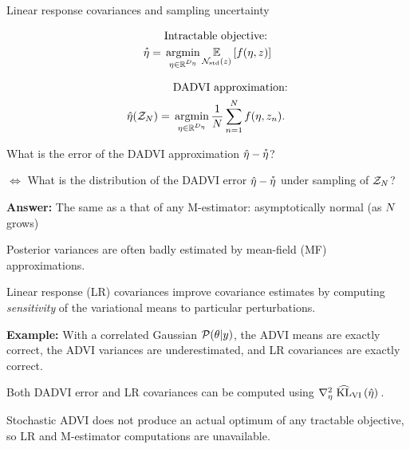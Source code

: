 \documentclass[8pt]{beamer}\usepackage[]{graphicx}\usepackage[]{color}
\begin{document}
\begin{frame}{Linear response covariances and sampling uncertainty}
%



\vspace{-2em}

\begin{minipage}[t]{0.48\textwidth}
    \begin{align*}
        &\text{Intractable objective:} 
        \\ \etastar %
            ={}& 
            \argmin_{\eta \in \etadom} \expect{\normz}{f(\eta, \z)}
    \end{align*}    
\end{minipage}
\begin{minipage}[t]{0.48\textwidth}
    \begin{align*}
        &\text{DADVI approximation:} 
        \\ \etahat(\Z) %
         ={}&  \argmin_{\eta \in \etadom} \meann f(\eta, \z_n).
    \end{align*}
\end{minipage}
%


\hrulefill

What is the error of the DADVI approximation $\hat{\eta} - \accentset{*}{\eta}$?

$\Leftrightarrow$ What is the distribution of the
DADVI error $\hat{\eta} - \accentset{*}{\eta}$ under sampling of $\mathcal{Z}_{N}$?

\textbf{Answer: } The same as a that of any M-estimator: 
    asymptotically normal (as $N$ grows) 

\hrulefill


Posterior variances are often badly estimated by mean-field (MF) approximations.

Linear response (LR) covariances improve covariance estimates by computing
\textit{sensitivity} of the variational means to 
particular perturbations.  \citep{giordano:2018:covariances}

\textbf{Example: } With a correlated Gaussian $\mathcal{P}(\theta \vert y)$,
the ADVI means are exactly correct, the ADVI variances are underestimated,
and LR covariances are exactly correct.

\hrulefill

Both DADVI error and LR covariances can be computed using
$\nabla^2_{\eta} \left. \widehat{\mathrm{KL}}_{\mathrm{VI}}\left(\hat{\eta}\right) \right.$.

Stochastic ADVI does not produce an actual optimum of any tractable
objective, so LR and M-estimator computations are unavailable.

\end{frame}
\end{document}
